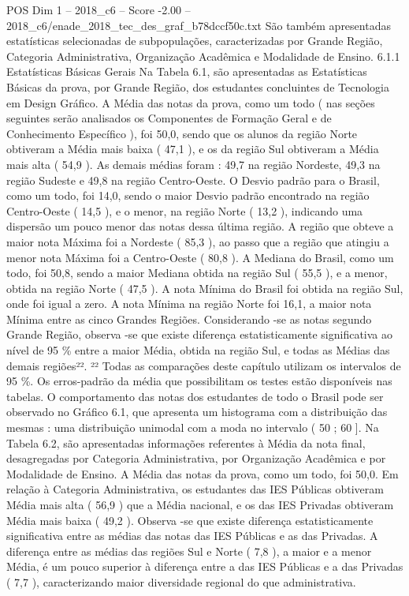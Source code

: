 \begin{textsample}{POS Dim 1 – 2018\_c6 – Score -2.00 – 2018\_c6/enade\_2018\_tec\_des\_graf\_b78dccf50c.txt}
São também apresentadas estatísticas selecionadas de subpopulações, caracterizadas por Grande Região, Categoria Administrativa, Organização Acadêmica e Modalidade de Ensino. 6.1.1 Estatísticas Básicas Gerais Na Tabela 6.1, são apresentadas as Estatísticas Básicas da prova, por Grande Região, dos estudantes concluintes de Tecnologia em Design Gráfico.
A Média das notas da prova, como um todo ( nas seções seguintes serão analisados os Componentes de Formação Geral e de Conhecimento Específico ), foi 50,0, sendo que os alunos da região Norte obtiveram a Média mais baixa ( 47,1 ), e os da região Sul obtiveram a Média mais alta ( 54,9 ).
As demais médias foram : 49,7 na região Nordeste, 49,3 na região Sudeste e 49,8 na região Centro-Oeste.
O Desvio padrão para o Brasil, como um todo, foi 14,0, sendo o maior Desvio padrão encontrado na região Centro-Oeste ( 14,5 ), e o menor, na região Norte ( 13,2 ), indicando uma dispersão um pouco menor das notas dessa última região.
A região que obteve a maior nota Máxima foi a Nordeste ( 85,3 ), ao passo que a região que atingiu a menor nota Máxima foi a Centro-Oeste ( 80,8 ).
A Mediana do Brasil, como um todo, foi 50,8, sendo a maior Mediana obtida na região Sul ( 55,5 ), e a menor, obtida na região Norte ( 47,5 ).
A nota Mínima do Brasil foi obtida na região Sul, onde foi igual a zero.
A nota Mínima na região Norte foi 16,1, a maior nota Mínima entre as cinco Grandes Regiões.
Considerando -se as notas segundo Grande Região, observa -se que existe diferença estatisticamente significativa ao nível de 95 \% entre a maior Média, obtida na região Sul, e todas as Médias das demais regiões²². ²² Todas as comparações deste capítulo utilizam os intervalos de 95 \%.
Os erros-padrão da média que possibilitam os testes estão disponíveis nas tabelas.
O comportamento das notas dos estudantes de todo o Brasil pode ser observado no Gráfico 6.1, que apresenta um histograma com a distribuição das mesmas : uma distribuição unimodal com a moda no intervalo ( 50 ; 60 ].
Na Tabela 6.2, são apresentadas informações referentes à Média da nota final, desagregadas por Categoria Administrativa, por Organização Acadêmica e por Modalidade de Ensino.
A Média das notas da prova, como um todo, foi 50,0.
Em relação à Categoria Administrativa, os estudantes das IES Públicas obtiveram Média mais alta ( 56,9 ) que a Média nacional, e os das IES Privadas obtiveram Média mais baixa ( 49,2 ).
Observa -se que existe diferença estatisticamente significativa entre as médias das notas das IES Públicas e as das Privadas.
A diferença entre as médias das regiões Sul e Norte ( 7,8 ), a maior e a menor Média, é um pouco superior à diferença entre a das IES Públicas e a das Privadas ( 7,7 ), caracterizando maior diversidade regional do que administrativa.

\end{textsample}
